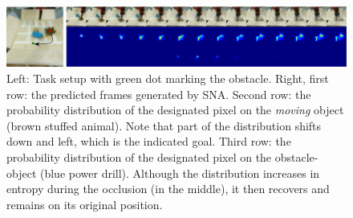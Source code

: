 \begin{figure}
\centering
\includegraphics[width=1\linewidth]{images_sna/multiobject_qualitative/avoid_obstacle.pdf}
\caption{Left: Task setup with green dot marking the obstacle. Right, first row: the predicted frames generated by SNA. Second row: the probability distribution of the designated pixel on the \textit{moving} object (brown stuffed animal). Note that part of the distribution shifts down and left, which is the indicated goal. Third row: the probability distribution of the designated pixel on the obstacle-object (blue power drill). Although the distribution increases in entropy during the occlusion (in the middle), it then recovers and remains on its original position.
\label{fig:goingaroundocclusion}}
\end{figure}



